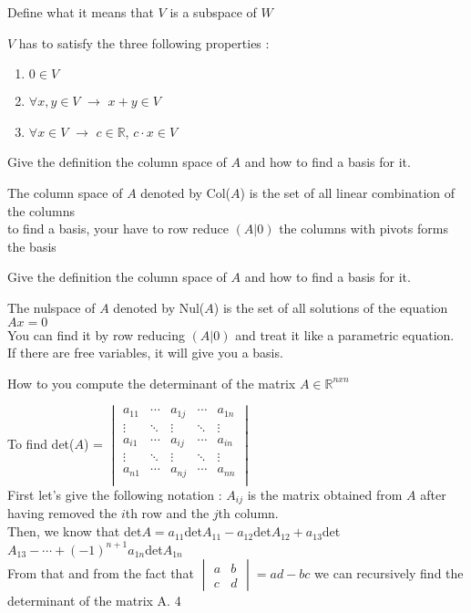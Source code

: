 \documentclass[12pt]{article}
\newcommand*{\xfield}[1]{\begin{mdframed}\centering #1\end{mdframed}\bigskip}
\newenvironment{note}{}{}
\begin{document}
\begin{note}
\xfield{Define what it means that $V$ is a subspace of $W$}
\xfield{$V$ has to satisfy the three following properties :\\
\begin{enumerate}
\item $0 \in V$
\item $\forall x,y \in V$ $\rightarrow$ $x + y \in V$
\item $\forall x \in V$ $\rightarrow$ $c \in \mathbb{R}$, $c \cdot x \in V$
\end{enumerate} }
\end{note}

\begin{note}
\xfield{Give the definition the column space of $A$ and how to find a basis for it.}
\xfield{The column space of $A$ denoted by Col($A$) is the set of all linear combination of the columns\\
to find a basis, your have to row reduce $(A|0)$ the columns with pivots forms the basis}
\end{note}

\begin{note}
\xfield{Give the definition the column space of $A$ and how to find a basis for it.}
\xfield{The nulspace of $A$ denoted by Nul($A$) is the set of all solutions of the equation $Ax=0$\\
You can find it by row reducing $(A|0)$ and treat it like a parametric equation. If there are free variables, it will give you a basis.}
\end{note}

\begin{note}
\xfield{How to you compute the determinant of the matrix $A \in \mathbb{R}^{nxn}$}
\xfield{To find det($A$) = $\begin{vmatrix}
 	  a_{11}&\cdots&a_{1j}&\cdots&a_{1n}\\
      \vdots&\ddots&\vdots&\ddots&\vdots\\
      a_{i1}&\cdots&a_{ij}&\cdots&a_{in}\\
      \vdots&\ddots&\vdots&\ddots&\vdots\\
      a_{n1}&\cdots&a_{nj}&\cdots&a_{nn}\\
\end{vmatrix}$ \\First let's give the following notation : $A_{ij}$ is the matrix obtained from $A$ after having removed the $i$th row and the $j$th column.\\
Then, we know that det$A = a_{11}$det$A_{11} - a_{12}$det$A_{12} +a_{13}$det$A_{13} - \cdots + (-1)^{n+1} a_{1n}$det$A_{1n}$\\
From that and from the fact that $\begin{vmatrix}
a&b\\
c&d
\end{vmatrix} = ad-bc$ we can recursively find the determinant of the matrix A. 4}
\end{note}
\end{document}

